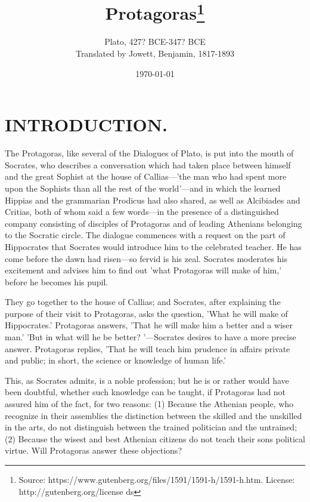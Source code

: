 \documentclass[11pt,letter]{article}
\begin{document}
\title{Protagoras\thanks{Source: https://www.gutenberg.org/files/1591/1591-h/1591-h.htm. License: http://gutenberg.org/license ds}}
\date{\today}
\author{Plato, 427? BCE-347? BCE\\ Translated by Jowett, Benjamin, 1817-1893}
\maketitle

\setcounter{tocdepth}{1}
\tableofcontents
\renewcommand{\baselinestretch}{1.0}
\normalsize
\newpage

\section{
      INTRODUCTION.
    }
\par  The Protagoras, like several of the Dialogues of Plato, is put into the mouth of Socrates, who describes a conversation which had taken place between himself and the great Sophist at the house of Callias—'the man who had spent more upon the Sophists than all the rest of the world'—and in which the learned Hippias and the grammarian Prodicus had also shared, as well as Alcibiades and Critias, both of whom said a few words—in the presence of a distinguished company consisting of disciples of Protagoras and of leading Athenians belonging to the Socratic circle. The dialogue commences with a request on the part of Hippocrates that Socrates would introduce him to the celebrated teacher. He has come before the dawn had risen—so fervid is his zeal. Socrates moderates his excitement and advises him to find out 'what Protagoras will make of him,' before he becomes his pupil.

\par  They go together to the house of Callias; and Socrates, after explaining the purpose of their visit to Protagoras, asks the question, 'What he will make of Hippocrates.' Protagoras answers, 'That he will make him a better and a wiser man.' 'But in what will he be better? '—Socrates desires to have a more precise answer. Protagoras replies, 'That he will teach him prudence in affairs private and public; in short, the science or knowledge of human life.'

\par  This, as Socrates admits, is a noble profession; but he is or rather would have been doubtful, whether such knowledge can be taught, if Protagoras had not assured him of the fact, for two reasons: (1) Because the Athenian people, who recognize in their assemblies the distinction between the skilled and the unskilled in the arts, do not distinguish between the trained politician and the untrained; (2) Because the wisest and best Athenian citizens do not teach their sons political virtue. Will Protagoras answer these objections?
\end{document}
